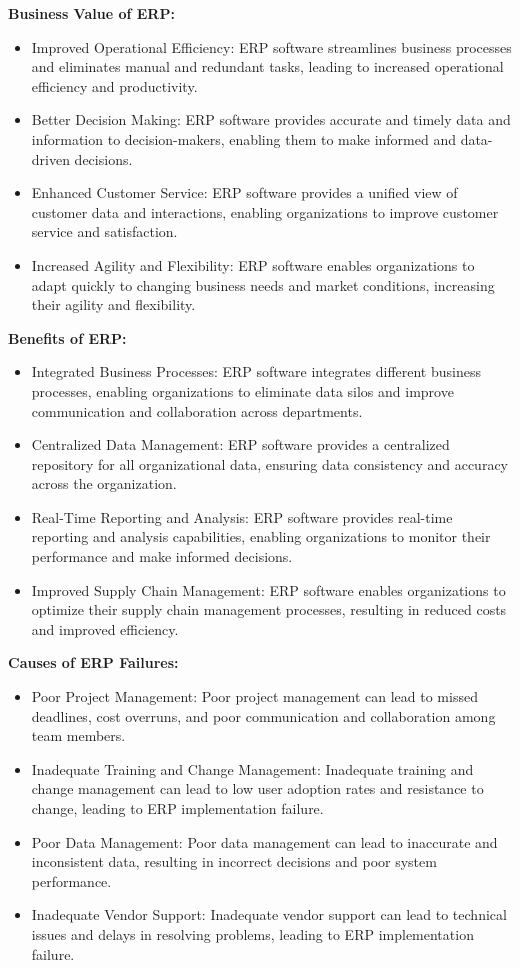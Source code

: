 \documentclass[12pt]{article}
\begin{document}
\begin{enumerate}
    \textbf{Business Value of ERP:}
    \begin{itemize}
    \item Improved Operational Efficiency: ERP software streamlines business processes and eliminates manual and redundant tasks, leading to increased operational efficiency and productivity.
    \item Better Decision Making: ERP software provides accurate and timely data and information to decision-makers, enabling them to make informed and data-driven decisions.
    \item Enhanced Customer Service: ERP software provides a unified view of customer data and interactions, enabling organizations to improve customer service and satisfaction.
    \item Increased Agility and Flexibility: ERP software enables organizations to adapt quickly to changing business needs and market conditions, increasing their agility and flexibility.
    \end{itemize}
    \textbf{Benefits of ERP:}
    \begin{itemize}
    \item Integrated Business Processes: ERP software integrates different business processes, enabling organizations to eliminate data silos and improve communication and collaboration across departments.
    \item Centralized Data Management: ERP software provides a centralized repository for all organizational data, ensuring data consistency and accuracy across the organization.
    \item Real-Time Reporting and Analysis: ERP software provides real-time reporting and analysis capabilities, enabling organizations to monitor their performance and make informed decisions.
    \item Improved Supply Chain Management: ERP software enables organizations to optimize their supply chain management processes, resulting in reduced costs and improved efficiency.
    \end{itemize}
    \textbf{Causes of ERP Failures:}
    \begin{itemize}
    \item Poor Project Management: Poor project management can lead to missed deadlines, cost overruns, and poor communication and collaboration among team members.
    \item Inadequate Training and Change Management: Inadequate training and change management can lead to low user adoption rates and resistance to change, leading to ERP implementation failure.
    \item Poor Data Management: Poor data management can lead to inaccurate and inconsistent data, resulting in incorrect decisions and poor system performance.
    \item Inadequate Vendor Support: Inadequate vendor support can lead to technical issues and delays in resolving problems, leading to ERP implementation failure.
    \end{itemize}


\end{enumerate}
\end{document}
